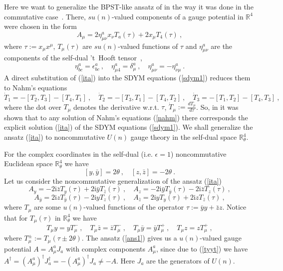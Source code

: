 \documentclass[a4paper,11pt]{article}
\numberwithin{equation}{section}
\def\th{\theta}
\def\de{\delta}
\def\e{\epsilon}
\def\m{\mu}
\def\n{\nu}
\newcommand{\im}{\mathrm{i}}
\newcommand{\zb}{{\bar{z}}}
\newcommand{\yb}{{\bar{y}}}
\newcommand{\td}{\dot{T}}
\newcommand{\rc}{{\mathbb{R}^4}}
\newcommand{\rct}{{\mathbb{R}^4_\theta}}
\def\+{\dagger}
\begin{document}
Here we want to generalize the BPST-like ansatz of \cite{Correa1} in the way
it was done in the commutative case~\cite{Ivanova:tu}. There,  $su(n)$-valued
components of a gauge potential in $\rc$ were chosen in the form  
\begin{equation}\label{ita}
A_\m = 2\eta^a_{\m\n} x_\n T_a (\tau ) + 2 x_\m T_4 (\tau )\ ,
\end{equation}
where $\tau := x_\m x^\m$,  $T_\m(\tau)$ are $su(n)$-valued functions of $\tau$
and $\eta^a_{\m\n}$ are the components of the self-dual 't~Hooft tensor~\cite{Prasad:1980yy},
\begin{equation}
\eta^a_{bc}=\e^a_{bc}\ ,\quad  \eta^a_{\m4}=\de^a_\m\ ,\quad  
\eta^a_{\m\n}=-\eta^a_{\n\m}\ .
\end{equation} 
A direct substitution of (\ref{ita}) into the SDYM equations (\ref{sdym1})
reduces them to Nahm's equations
\begin{equation}\label{nahm}
\td_1 =-[T_2,T_3]-[T_4,T_1]\ , \quad 
\td_2 =-[T_3,T_1]-[T_4,T_2]\ ,  \quad
\td_3 =-[T_1,T_2]-[T_4,T_3]\ ,
\end{equation}
where the dot over $T_\m$ denotes the derivative w.r.t. $\tau$, $\td_\m :=\frac{dT_\m}{d\tau}$.  
So, in  \cite{Ivanova:tu} it was shown that to any  solution of Nahm's equations 
(\ref{nahm}) there corresponds the explicit solution (\ref{ita}) 
of the SDYM equations (\ref{sdym1}). We shall generalize 
the ansatz (\ref{ita}) to noncommutative $U(n)$ gauge theory in the self-dual space $\rct$.

{}For the complex coordinates in the self-dual (i.e. $\e =1$) noncommutative Euclidean 
space $\rct$ we have 
$$[y,\yb ]=2\th\ , \quad [z,\zb ]=-2\th\ .$$ 
Let us consider the noncommutative generalization of 
the ansatz (\ref{ita})
$$A_y = - 2\im\bar z T_y(\tau) + 2\im \bar y T_{\bar z}(\tau)\ , 
\quad
A_z = - 2\im \bar y T_{\bar y}(\tau )-2\im \bar z T_z(\tau)\ , $$
\begin{equation}
A_{\bar y} = 2\im z {T}_{\yb}(\tau)  - 2\im  y{T}_{z}(\tau ) \ ,
\quad
A_{\bar z} = 2\im  y{T}_{y}(\tau ) + 2\im  z{T}_{\zb}(\tau ) \ , 
\label{ans1}
\end{equation}
where $T_\m$ are some $u(n)$-valued functions of the operator 
$\tau :=\bar y y+ \bar z z$. Notice that for ${T}_{\m}(\tau )$ in 
$\rct$ we have
\begin{equation}\label{tyyt}
T_\m y=yT^-_\m\ ,\quad T_\m \zb = \zb T^-_\m\ ,\quad T_\m \yb =\yb T^+_\m\ ,\quad
T_\m z=zT^+_\m\ ,
\end{equation}
where $T^\pm_\m := {T}_{\m}(\tau \pm 2\th)$.
The ansatz (\ref{ans1}) gives us a $u(n)$-valued gauge potential $A=A_\m^aJ_a$ with 
complex components $A_\m^a$, since due to (\ref{tyyt}) we have
$A^\+ = (A_\m^a)^\+ J_a^\+= - (A_\m^a)^\+ J_a\ne -A$. Here
 $J_a$ are the generators of $U(n)$. 
\end{document}
